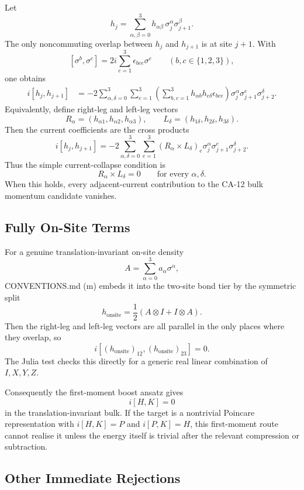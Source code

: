 Let
\[
  h_j=\sum_{\alpha,\beta=0}^3
    h_{\alpha\beta}\,\sigma_j^\alpha\sigma_{j+1}^\beta.
\]
The only noncommuting overlap between \(h_j\) and \(h_{j+1}\) is at site
\(j+1\).  With
\[
  [\sigma^b,\sigma^c]=2i\sum_{e=1}^3\epsilon_{bce}\sigma^e
  \qquad (b,c\in\{1,2,3\}),
\]
one obtains
\[
\begin{aligned}
  i[h_j,h_{j+1}]
  &=
  -2\sum_{\alpha,\delta=0}^3\sum_{e=1}^3
    \left(\sum_{b,c=1}^3
      h_{\alpha b}h_{c\delta}\epsilon_{bce}
    \right)
    \sigma_j^\alpha\sigma_{j+1}^e\sigma_{j+2}^\delta .
\end{aligned}
\]
Equivalently, define right-leg and left-leg vectors
\[
  R_\alpha=(h_{\alpha1},h_{\alpha2},h_{\alpha3}),\qquad
  L_\delta=(h_{1\delta},h_{2\delta},h_{3\delta}).
\]
Then the current coefficients are the cross products
\[
  i[h_j,h_{j+1}]
  =
  -2\sum_{\alpha,\delta=0}^3
  \sum_{e=1}^3 (R_\alpha\times L_\delta)_e
  \sigma_j^\alpha\sigma_{j+1}^e\sigma_{j+2}^\delta .
\]
Thus the simple current-collapse condition is
\[
  R_\alpha\times L_\delta=0
  \qquad\text{for every }\alpha,\delta.
\]
When this holds, every adjacent-current contribution to the CA-12 bulk momentum
candidate vanishes.

\subsection{Fully On-Site Terms}

For a genuine translation-invariant on-site density
\[
  A=\sum_{\alpha=0}^3 a_\alpha\sigma^\alpha,
\]
CONVENTIONS.md (m) embeds it into the two-site bond tier by the symmetric split
\[
  h_{\mathrm{onsite}}
  =
  \frac12(A\otimes I+I\otimes A).
\]
Then the right-leg and left-leg vectors are all parallel in the only places
where they overlap, so
\[
  i[(h_{\mathrm{onsite}})_{12},(h_{\mathrm{onsite}})_{23}]=0.
\]
The Julia test checks this directly for a generic real linear combination of
\(I,X,Y,Z\).

Consequently the first-moment boost ansatz gives
\[
  i[H,K]=0
\]
in the translation-invariant bulk.  If the target is a nontrivial Poincare
representation with \(i[H,K]=P\) and \(i[P,K]=H\), this first-moment route
cannot realise it unless the energy itself is trivial after the relevant
compression or subtraction.

\subsection{Other Immediate Rejections}

